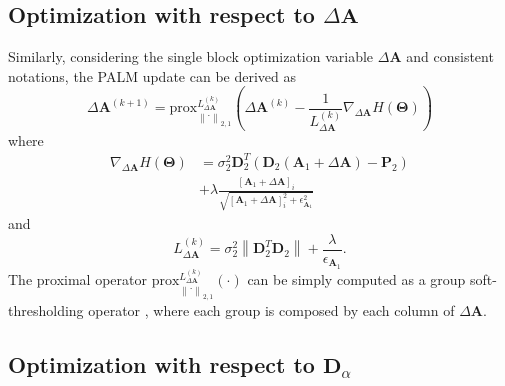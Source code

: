 \documentclass[review]{elsarticle}
\begin{document}
\subsection{Optimization with respect to \texorpdfstring{$\Delta\mathbf{A}$}{DA}}

Similarly, considering the single block optimization variable $\Delta\mathbf{A}$ and consistent notations, the PALM update can be derived as
\begin{equation}
		\Delta\mathbf{A}^{(k+1)} = \mathrm{prox}^{L_{\Delta\mathbf{A}}^{(k)} }_{\left\|\cdot\right\|_{2,1}}\left(\Delta\mathbf{A}^{(k)} - \frac{1}{L_{\Delta\mathbf{A}}^{(k)} }\nabla_{\Delta\mathbf{A}} H(\boldsymbol{\Theta}) \right)
        \label{eq:deltacode_Update}
\end{equation}
where
\begin{equation}
\begin{aligned}
		\nabla_{\Delta\mathbf{A}} H(\boldsymbol{\Theta}) &= \sigma_{2}^2\mathbf{D}_{2}^{T}\left( \mathbf{D}_{2}\left(\mathbf{A}_{1} + \Delta\mathbf{A}\right)-\mathbf{P}_{2}\right) \\
&+ \lambda \frac{\left[\mathbf{A}_{1} + \Delta\mathbf{A}\right]_{i}}{\sqrt{\left[\mathbf{A}_{1} + \Delta\mathbf{A}\right]_{i}^{2} + \epsilon_{\mathbf{A}_{1}}^{2}}}
        \label{eq:nabla_deltacode}
\end{aligned}
\end{equation}
and
\begin{equation}
		L_{\Delta\mathbf{A}}^{(k)} = \sigma_{2}^2\left\|\mathbf{D}_{2}^{T}\mathbf{D}_{2}\right\| + \frac{\lambda}{\epsilon_{\mathbf{A}_{1}}}.
        \label{eq:lip_deltacode}
\end{equation}
The proximal operator $\mathrm{prox}^{L_{\Delta\mathbf{A}}^{(k)} }_{\left\|\cdot\right\|_{2,1}}(\cdot)$ can be simply computed as a group soft-thresholding operator \citep{ferraris_robust_2017}, where each group is composed by each column of $\Delta\mathbf{A}$.

\subsection{Optimization with respect to \texorpdfstring{$\mathbf{D}_{\alpha}$}{Da}}
\end{document}
